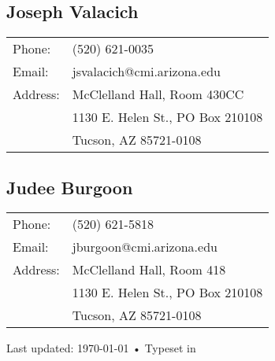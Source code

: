 \documentclass[10pt, a4paper]{article}
\begin{document}
\subsection*{Joseph Valacich} 

\begin{tabular}{ll}
  Phone: & (520) 621-0035 \\
  Email: & jsvalacich@cmi.arizona.edu\\
  Address: & McClelland Hall, Room 430CC\\
  & 1130 E. Helen St., PO Box 210108\\
  & Tucson, AZ 85721-0108
\end{tabular}

\subsection*{Judee Burgoon} 

\begin{tabular}{ll}
  Phone: & (520) 621-5818 \\
  Email: & jburgoon@cmi.arizona.edu\\
  Address: & McClelland Hall, Room 418\\
  & 1130 E. Helen St., PO Box 210108\\
  & Tucson, AZ 85721-0108
\end{tabular}

\vfill{}

\begin{center}
{\scriptsize  Last updated: \today\- •\- 
Typeset in \href{http://nitens.org/taraborelli/cvtex}{
\XeTeX }\\
}
\end{center}
\end{document}
